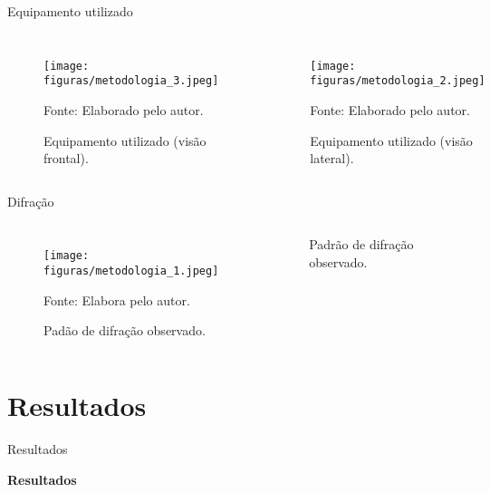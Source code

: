 \documentclass[aspectratio=169,12.5pt,xcolor=dvipsnames]{beamer}
\begin{document}
\begin{frame}{Equipamento utilizado}

    \begin{columns}[c]
        \begin{figure}
          \centering
          \caption{Equipamento utilizado (visão frontal).}
          \texttt{[image: figuras/metodologia\_3.jpeg]}\par
          {\scriptsize Fonte: Elaborado pelo autor.}
        \end{figure}

        \begin{figure}
          \centering
          \caption{Equipamento utilizado (visão lateral).}
          \texttt{[image: figuras/metodologia\_2.jpeg]}\par
          {\scriptsize Fonte: Elaborado pelo autor.}
        \end{figure}

    \end{columns}

    
\end{frame}


\begin{frame}{Difração}

    \begin{columns}[c]
        \begin{figure}
          \centering
          \caption{Padão de difração observado.}
          \texttt{[image: figuras/metodologia\_1.jpeg]}\par
        {\scriptsize Fonte: Elabora pelo autor.}
        \end{figure}

        Padrão de difração observado.
    \end{columns}

    
\end{frame}

\section{Resultados}

\begin{frame}{Resultados}
    \Huge{\centerline{\textbf{Resultados}}}
\end{frame}
\end{document}
